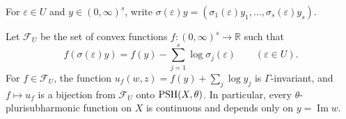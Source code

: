 For $\varepsilon\in U$ and $y\in(0,\infty)^s$, write $\sigma(\varepsilon)y=(\sigma_1(\varepsilon)y_1,\ldots,\sigma_s(\varepsilon)y_s)$.

\begin{theorem}\label{thm:ot-transverse-potentials}
Let $\mathcal F_U$ be the set of convex functions $f\colon(0,\infty)^s\to\mathbb R$ such that
\begin{equation}\label{eq:ot-automorphy}
 f(\sigma(\varepsilon)y)=f(y)-\sum_{j=1}^s\log\sigma_j(\varepsilon)
 \qquad(\varepsilon\in U).
\end{equation}
For $f\in\mathcal F_U$, the function $u_f(w,z)=f(y)+\sum_j\log y_j$ is $\Gamma$-invariant, and $f\mapsto u_f$ is a bijection from $\mathcal F_U$ onto $\mathrm{PSH}(X,\theta)$. In particular, every $\theta$-plurisubharmonic function on $X$ is continuous and depends only on $y=\operatorname{Im}w$.
\end{theorem}
